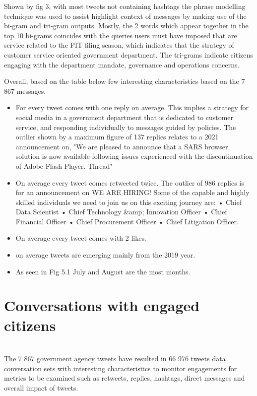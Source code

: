 Shown by fig 3, with most tweets not containing hashtags the phrase modelling technique was used to assist highlight context of messages by making use of the bi-gram and tri-gram outputs. Mostly, the 2 words which appear together in the top 10 bi-grams coincides with the queries users must have imposed that are service related to the PIT filing season, which indicates that the strategy of customer service oriented government department.  The tri-grams indicate citizens engaging with the department mandate, governance and operations concerns.

Overall, based on the table below few interesting characteristics based on the 7 867 messages.
\begin{itemize}
    \item For every tweet comes with one reply on average. This implies a strategy for social media in a government department that is dedicated to customer service, and responding individually to messages guided by policies.  The outlier shown by a maximum figure of 137 replies relates to a 2021 announcement on,  "We are pleased to announce that a SARS browser solution is now available following issues experienced with the discontinuation of Adobe Flash Player. Thread"
    \item On average every tweet comes retweeted twice.  The outlier of 986 replies is for an announcement on WE ARE HIRING! Some of the capable and highly skilled individuals we need to join us on this exciting journey are: • Chief Data Scientist • Chief Technology &amp; Innovation Officer • Chief Financial Officer • Chief Procurement Officer • Chief Litigation Officer.
    \item On average every tweet comes with 2 likes.
    \item on average tweets are emerging mainly from the 2019 year.
    \item As seen in Fig 5.1 July and August are the most months.
\end{itemize}

\section{Conversations with engaged citizens}\\

The 7 867 government agency tweets have resulted in 
66 976 tweets data conversation sets with interesting characteristics to monitor engagements for metrics to be examined such as retweets, replies, hashtags, direct messages and overall impact of tweets. 

